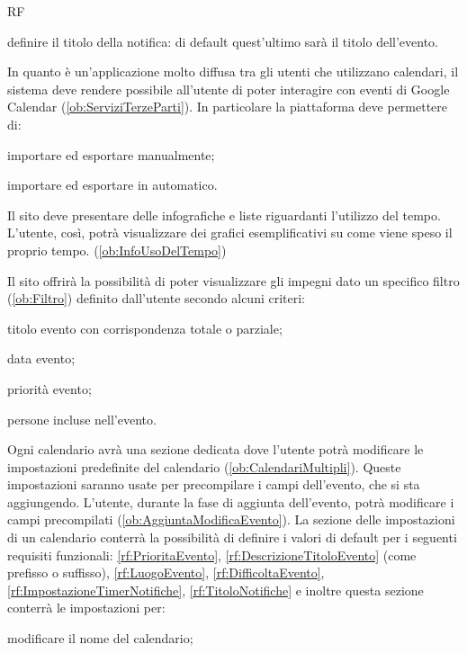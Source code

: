 \begin{listaPersonale}{RF}
\begin{listaPersonale2}[RF]{}
		 definire il titolo della notifica: di default quest'ultimo sarà il titolo dell'evento.
	\end{listaPersonale2}

	 In quanto è un'applicazione molto diffusa tra gli utenti che utilizzano calendari, il sistema deve rendere possibile all'utente di poter interagire con eventi di Google Calendar (\ref{ob:ServiziTerzeParti}). In particolare la piattaforma deve permettere di:
	\begin{listaPersonale2}[RF]{}
		 importare ed esportare manualmente;

		 importare ed esportare in automatico.
	\end{listaPersonale2}

	 Il sito deve presentare delle infografiche e liste riguardanti l'utilizzo del tempo. L'utente, così, potrà visualizzare dei grafici esemplificativi su come viene speso il proprio tempo. (\ref{ob:InfoUsoDelTempo})

	 Il sito offrirà la possibilità di poter visualizzare gli impegni dato un specifico filtro (\ref{ob:Filtro}) definito dall'utente secondo alcuni criteri:
	\begin{listaPersonale2}[RF]{}
		 titolo evento con corrispondenza totale o parziale;

		 data evento;

		 priorità evento;

		 persone incluse nell'evento.
	\end{listaPersonale2}

	 Ogni calendario avrà una sezione dedicata dove l'utente potrà modificare le impostazioni predefinite del calendario (\ref{ob:CalendariMultipli}). Queste impostazioni saranno usate per precompilare i campi dell'evento, che si sta aggiungendo. L'utente, durante la fase di aggiunta dell'evento, potrà modificare i campi precompilati (\ref{ob:AggiuntaModificaEvento}). La sezione delle impostazioni di un calendario conterrà la possibilità di definire i valori di default per i seguenti requisiti funzionali: \ref{rf:PrioritaEvento}, \ref{rf:DescrizioneTitoloEvento} (come prefisso o suffisso), \ref{rf:LuogoEvento}, \ref{rf:DifficoltaEvento}, \ref{rf:ImpostazioneTimerNotifiche}, \ref{rf:TitoloNotifiche} e inoltre questa sezione conterrà le impostazioni per:
	\begin{listaPersonale2}[RF]{}
		 modificare il nome del calendario;


\end{listaPersonale2}
\end{listaPersonale}
